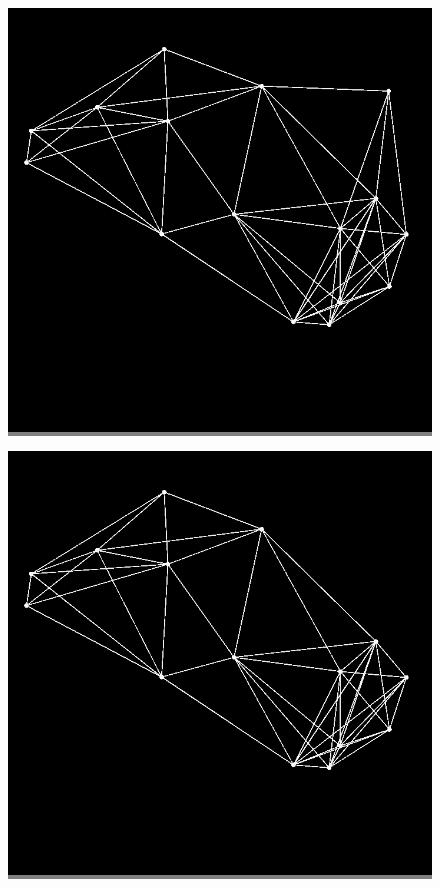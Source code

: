 \documentclass{article}
\begin{document}
\begin{figure}
\begin{minipage}{0.2\textwidth}
            \end{minipage}
            \vskip 0.1in
            \begin{minipage}{0.2\textwidth}
            \colorbox{gray}{\includegraphics[width=\linewidth]{./images/slvo-4.png}}
            \end{minipage}
            \hspace{\fill}
            \begin{minipage}{0.2\textwidth}
            \colorbox{gray}{\includegraphics[width=\linewidth]{./images/slvo-5.png}}

\end{minipage}
\end{figure}
\end{document}
